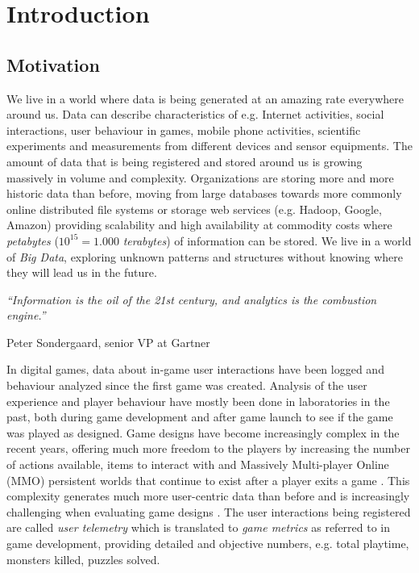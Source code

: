 
\chapter{Introduction} %
\label{Chapter1}

\section{Motivation}
We live in a world where data is being generated at an amazing rate everywhere around us. Data can describe characteristics of e.g. Internet activities, social interactions, user behaviour in games, mobile phone activities, scientific experiments and measurements from different devices and sensor equipments. The amount of data that is being registered and stored around us is growing massively in volume and complexity. Organizations are storing more and more historic data than before, moving from large databases towards more commonly online distributed file systems or storage web services (e.g. Hadoop, Google, Amazon) providing scalability and high availability at commodity costs where \textit{petabytes} ($10^{15} = 1.000$ \textit{terabytes}) of information can be stored. We live in a world of \textit{Big Data}, exploring unknown patterns and structures without knowing where they will lead us in the future. 

\null
\textit{``Information is the oil of the 21st century, and analytics is the combustion engine.''}

\begin{flushright}
Peter Sondergaard, senior VP at Gartner
\end{flushright}

In digital games, data about in-game user interactions have been logged and behaviour analyzed since the first game was created. Analysis of the user experience and player behaviour have mostly been done in laboratories in the past, both during game development and after game launch to see if the game was played as designed. Game designs have become increasingly complex in the recent years, offering much more freedom to the players by increasing the number of actions available, items to interact with and Massively Multi-player Online (MMO) persistent worlds that continue to exist after a player exits a game \citep{Kim:2008Tracking, Drachen:2011Evaluating}. This complexity generates much more user-centric data than before and is increasingly challenging when evaluating game designs \citep{Pagulayan:2002UserDesign, Seif:2013GameAnalytics}. The user interactions being registered are called \textit{user telemetry} which is translated to \textit{game metrics} as referred to in game development, providing detailed and objective numbers, e.g. total playtime, monsters killed, puzzles solved.

